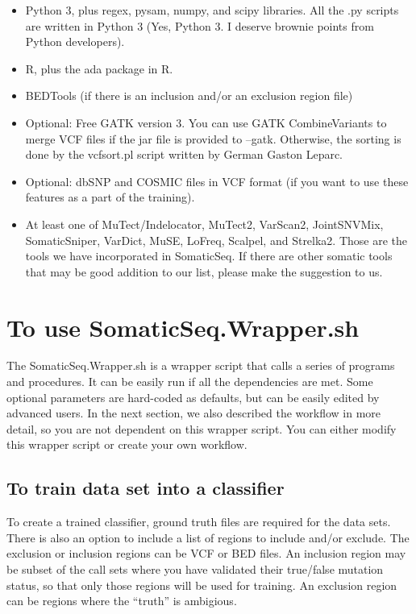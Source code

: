 \documentclass[10pt,letterpaper]{article}
\begin{document}
\begin{sloppypar}
\begin{itemize}
\item
Python 3, plus regex, pysam, numpy, and scipy libraries. All the .py scripts are written in Python 3 (Yes, Python 3. I deserve brownie points from Python developers).

\item
R, plus the ada package in R.

\item
BEDTools (if there is an inclusion and/or an exclusion region file)

\item
Optional: Free GATK version 3. You can use GATK CombineVariants to merge VCF files if the jar file is provided to --gatk. Otherwise, the sorting is done by the vcfsort.pl script written by German Gaston Leparc. 

\item
Optional: dbSNP and COSMIC files in VCF format (if you want to use these features as a part of the training).

\item
At least one of MuTect/Indelocator, MuTect2, VarScan2, JointSNVMix, SomaticSniper, VarDict, MuSE, LoFreq, Scalpel, and Strelka2. Those are the tools we have incorporated in SomaticSeq. If there are other somatic tools that may be good addition to our list, please make the suggestion to us. 

\end{itemize}



\section{To use SomaticSeq.Wrapper.sh}

The SomaticSeq.Wrapper.sh is a wrapper script that calls a series of programs and procedures. It can be easily run if all the dependencies are met. Some optional parameters are hard-coded as defaults, but can be easily edited by advanced users. In the next section, we also described the workflow in more detail, so you are not dependent on this wrapper script. You can either modify this wrapper script or create your own workflow. 


\subsection{To train data set into a classifier}

To create a trained classifier, ground truth files are required for the data sets. There is also an option to include a list of regions to include and/or exclude. The exclusion or inclusion regions can be VCF or BED files. An inclusion region may be subset of the call sets where you have validated their true/false mutation status, so that only those regions will be used for training. An exclusion region can be regions where the ``truth'' is ambigious. 


\end{sloppypar}
\end{document}
